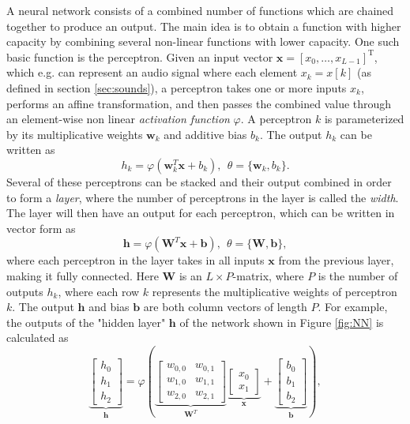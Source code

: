 \documentclass{report}
\begin{document}
A neural network consists of a combined number of functions which are chained together to produce an output. The main idea is to obtain a function with higher capacity by combining several non-linear functions with lower capacity. One such basic function is the perceptron. Given an input vector $\bm{x}=[x_0, \dots, x_{L-1}]^\text{T}$, which e.g. can represent an audio signal where each element $x_k = x[k]$ (as defined in section \ref{sec:sounds}), a perceptron takes one or more inputs $x_k$, performs an affine transformation, and then passes the combined value through an element-wise non linear \textit{activation function} $\varphi$. A perceptron $k$ is parameterized by its multiplicative weights $\bm{w}_k$ and additive bias $b_k$. The output $h_k$ can be written as
\begin{equation} \label{eq:perc}
    h_k = \varphi\left( \bm{w}^T_k \bm{x} + b_k \right), \ \ \theta = \{ \bm{w}_k, b_k\}.
\end{equation}
Several of these perceptrons can be stacked and their output combined in order to form a \textit{layer}, where the number of perceptrons in the layer is called the \textit{width}. The layer will then have an output for each perceptron, which can be written in vector form as
\begin{equation}
    \bm{h} = \varphi\left( \bm{W}^T \bm{x} + \bm{b}\right), \ \ \theta = \{ \bm{W}, \bm{b} \},
\end{equation}
where each perceptron in the layer takes in all inputs $\bm{x}$ from the previous layer, making it fully connected. Here $\bm{W}$ is an $L \times P$-matrix, where $P$ is the number of outputs $h_k$, where each row $k$ represents the multiplicative weights of perceptron $k$. The output $\bm{h}$ and bias $\bm{b}$ are both column vectors of length $P$. For example, the outputs of the "hidden layer" $\bm{h}$ of the network shown in Figure \ref{fig:NN} is calculated as
\begin{equation}
\underbrace{
\left[
    \begin{array}{c}
         h_0 \\
         h_1 \\
         h_2
    \end{array} \right]}_{\bm{h}}
= \varphi \left(
\underbrace{\left[ \begin{array}{cc}
     w_{0,0} & w_{0,1} \\
     w_{1,0} & w_{1,1} \\
     w_{2,0} & w_{2,1}
\end{array} \right]}_{\bm{W}^T}
\underbrace{
\left[ 
\begin{array}{c}
     x_0  \\
     x_1 
\end{array}
\right]}_{\bm{x}} +
\underbrace{\left[ 
\begin{array}{c}
    b_0 \\
    b_1 \\
    b_2
\end{array}
\right]}_{\bm{b}}
\right),
\end{equation}
\end{document}
